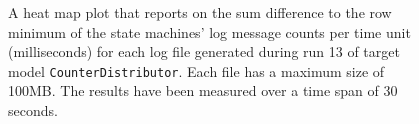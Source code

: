 \begin{figure}[htbp]
\centering
\begin{minipage}{1\textwidth}
  \centering
\end{minipage}
\caption{A heat map plot that reports on the sum difference to the row minimum of the state machines' log message counts per time unit (milliseconds) for each log file generated during run 13 of target model \texttt{CounterDistributor}. Each file has a maximum size of 100MB. The results have been measured over a time span of 30 seconds.}
\label{figure:throughput_difference_counterdistributor_13}
\end{figure}